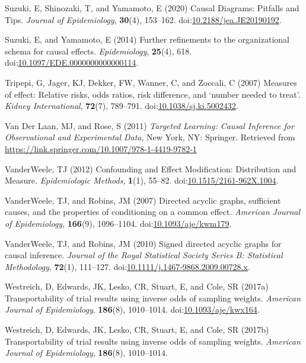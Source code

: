 \documentclass[
  single column]{article}
\newlength{\cslhangindent}
\newenvironment{CSLReferences}[2] %
 {\begin{list}{}{%
  \setlength{\itemindent}{0pt}
  \setlength{\leftmargin}{0pt}
  \setlength{\parsep}{0pt}
  \ifodd #1
   \setlength{\leftmargin}{\cslhangindent}
   \setlength{\itemindent}{-1\cslhangindent}
  \fi
  \setlength{\itemsep}{#2\baselineskip}}}
 {\end{list}}
\begin{document}
\begin{CSLReferences}{1}{0}
Suzuki, E, Shinozaki, T, and Yamamoto, E (2020) Causal Diagrams:
Pitfalls and Tips. \emph{Journal of Epidemiology}, \textbf{30}(4),
153--162.
doi:\href{https://doi.org/10.2188/jea.JE20190192}{10.2188/jea.JE20190192}.

Suzuki, E, and Yamamoto, E (2014) Further refinements to the
organizational schema for causal effects. \emph{Epidemiology},
\textbf{25}(4), 618.
doi:\href{https://doi.org/10.1097/EDE.0000000000000114}{10.1097/EDE.0000000000000114}.

Tripepi, G, Jager, KJ, Dekker, FW, Wanner, C, and Zoccali, C (2007)
Measures of effect: Relative risks, odds ratios, risk difference, and
{`}number needed to treat{'}. \emph{Kidney International},
\textbf{72}(7), 789--791.
doi:\href{https://doi.org/10.1038/sj.ki.5002432}{10.1038/sj.ki.5002432}.

Van Der Laan, MJ, and Rose, S (2011) \emph{Targeted Learning: Causal
Inference for Observational and Experimental Data}, New York, NY:
Springer. Retrieved from
\url{https://link.springer.com/10.1007/978-1-4419-9782-1}

VanderWeele, TJ (2012) Confounding and Effect Modification: Distribution
and Measure. \emph{Epidemiologic Methods}, \textbf{1}(1), 55--82.
doi:\href{https://doi.org/10.1515/2161-962X.1004}{10.1515/2161-962X.1004}.

VanderWeele, TJ, and Robins, JM (2007) Directed acyclic graphs,
sufficient causes, and the properties of conditioning on a common
effect. \emph{American Journal of Epidemiology}, \textbf{166}(9),
1096--1104.
doi:\href{https://doi.org/10.1093/aje/kwm179}{10.1093/aje/kwm179}.

VanderWeele, TJ, and Robins, JM (2010) Signed directed acyclic graphs
for causal inference. \emph{Journal of the Royal Statistical Society
Series B: Statistical Methodology}, \textbf{72}(1), 111--127.
doi:\href{https://doi.org/10.1111/j.1467-9868.2009.00728.x}{10.1111/j.1467-9868.2009.00728.x}.

Westreich, D, Edwards, JK, Lesko, CR, Stuart, E, and Cole, SR (2017a)
Transportability of trial results using inverse odds of sampling
weights. \emph{American Journal of Epidemiology}, \textbf{186}(8),
1010--1014.
doi:\href{https://doi.org/10.1093/aje/kwx164}{10.1093/aje/kwx164}.

Westreich, D, Edwards, JK, Lesko, CR, Stuart, E, and Cole, SR (2017b)
Transportability of trial results using inverse odds of sampling
weights. \emph{American Journal of Epidemiology}, \textbf{186}(8),
1010--1014.

\end{CSLReferences}
\end{document}
